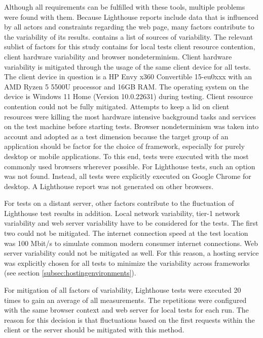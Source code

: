 \documentclass[a4paper, 12pt]{article}
\begin{document}
Although all requirements can be fulfilled with these tools, multiple problems were found with them.
Because Lighthouse reports include data that is influenced by all actors and constraints regarding the web page, many factors contribute to the variability of its results.
\cite{lighthouseVariability} contains a list of sources of variability.
The relevant sublist of factors for this study contains for local tests client resource contention, client hardware variability and browser nondeterminism.
Client hardware variability is mitigated through the usage of the same client device for all tests.
The client device in question is a HP Envy x360 Convertible 15-eu0xxx with an AMD Ryzen 5 5500U processor and 16GB RAM.
The operating system on the device is Windows 11 Home (Version 10.0.22631) during testing.
Client resource contention could not be fully mitigated.
Attempts to keep a lid on client resources were killing the most hardware intensive background tasks and services on the test machine before starting tests.
Browser nondeterminism was taken into account and adopted as a test dimension because the target group of an application should be factor for the choice of framework, especially for purely desktop or mobile applications.
To this end, tests were executed with the most commonly used browsers wherever possible.
For Lighthouse tests, such an option was not found.
Instead, all tests were explicitly executed on Google Chrome for desktop.
A Lighthouse report was not generated on other browsers.

For tests on a distant server, other factors contribute to the fluctuation of Lighthouse test results in addition.
Local network variability, tier-1 network variability and web server variability have to be considered for the tests.
The first two could not be mitigated.
The internet connection speed at the test location was 100 Mbit/s to simulate common modern consumer internet connections. %
Web server variability could not be mitigated as well.
For this reason, a hosting service was explicitly chosen for all tests to minimize the variability across frameworks (see section \ref{subsec:hostingenvironments}).

For mitigation of all factors of variability, Lighthouse tests were executed 20 times to gain an average of all measurements.
The repetitions were configured with the same browser context and web server for local tests for each run.
The reason for this decision is that fluctuations based on the first requests within the client or the server should be mitigated with this method.
\end{document}
